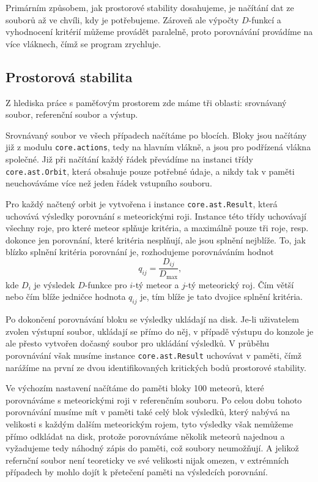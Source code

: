 \smallskip

Primárním způsobem, jak prostorové stability dosahujeme, je načítání dat ze souborů až ve chvíli, kdy je potřebujeme. Zároveň ale výpočty $D$-funkcí a vyhodnocení kritérií můžeme provádět paralelně, proto porovnávání provádíme na více vláknech, čímž se program zrychluje.

\subsection{Prostorová stabilita}%
Z hlediska práce s paměťovým prostorem zde máme tři oblasti: srovnávaný soubor, referenční soubor a výstup.

\medskip

Srovnávaný soubor ve všech případech načítáme po blocích. Bloky jsou načítány již z modulu \texttt{core.actions}, tedy na hlavním vlákně, a jsou pro podřízená vlákna společné. Již při načítání každý řádek převádíme na instanci třídy \texttt{core.ast.Orbit}, která obsahuje pouze potřebné údaje, a nikdy tak v paměti neuchováváme více než jeden řádek vstupního souboru.

Pro každý načtený orbit je vytvořena i instance \texttt{core.ast.Result}, která uchovává výsledky porovnání s meteorickými roji. Instance této třídy uchovávají všechny roje, pro které meteor splňuje kritéria, a maximálně pouze tři roje, resp. dokonce jen porovnání, které kritéria nesplňují, ale jsou splnění nejblíže. To, jak blízko splnění kritéria porovnání je, rozhodujeme porovnáváním hodnot
\begin{equation}
    q_{ij}=\frac{D_{ij}}{D_\text{max}}\text{,}
\end{equation}
kde $D_i$ je výsledek $D$-funkce pro $i$-tý meteor a $j$-tý meteorický roj. Čím větší nebo čím blíže jedničce hodnota $q_{ij}$ je, tím blíže je tato dvojice splnění kritéria.

Po dokončení porovnávání bloku se výsledky ukládají na disk. Je-li uživatelem zvolen výstupní soubor, ukládají se přímo do něj, v případě výstupu do konzole je ale přesto vytvořen dočasný soubor pro ukládání výsledků. V průběhu porovnávání však musíme instance \texttt{core.ast.Result} uchovávat v paměti, čímž narážíme na první ze dvou identifikovaných kritických bodů prostorové stability.

\smallskip

Ve výchozím nastavení načítáme do paměti bloky 100 meteorů, které porovnáváme s meteorickými roji v referenčním souboru. Po celou dobu tohoto porovnávání musíme mít v paměti také celý blok výsledků, který nabývá na velikosti s každým dalším meteorickým rojem, tyto výsledky však nemůžeme přímo odkládat na disk, protože porovnáváme několik meteorů najednou a vyžadujeme tedy náhodný zápis do paměti, což soubory neumožňují. A jelikož refernční soubor není teoreticky ve své velikosti nijak omezen, v extrémních případech by mohlo dojít k přetečení paměti na výsledcích porovnání.

